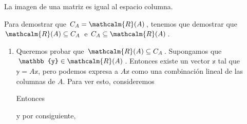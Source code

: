 \begin{theorem}{}{}
    La imagen de una matriz es igual al espacio columna.

    \tcblower
    \demostracion Para demostrar que $C_A = \mathcalm{R}(A)$, tenemos que demostrar que $\mathcalm{R}(A) \subseteq C_A$ e $C_A \subseteq \mathcalm{R}(A)$.
    \begin{enumerate}[label=\roman*), topsep=6pt, itemsep=0pt]
        \item Queremos probar que $\mathcalm{R}(A) \subseteq C_A$. Supongamos que $\mathbb{y} \in \mathcalm{R}(A)$. Entonces existe un vector $\mathbb{x}$ tal que $\mathbb{y} = A\mathbb{x}$, pero podemos expresa a $A\mathbb{x}$ como una combinación lineal de las columnas de $A$. Para ver esto, consideremos
        \begin{matrizn}
        \end{matrizn}
        Entonces
        \begin{matrizn}
        \end{matrizn}
        y por consiguiente,
        \begin{matrizn}

\end{matrizn}
\end{enumerate}
\end{theorem}
